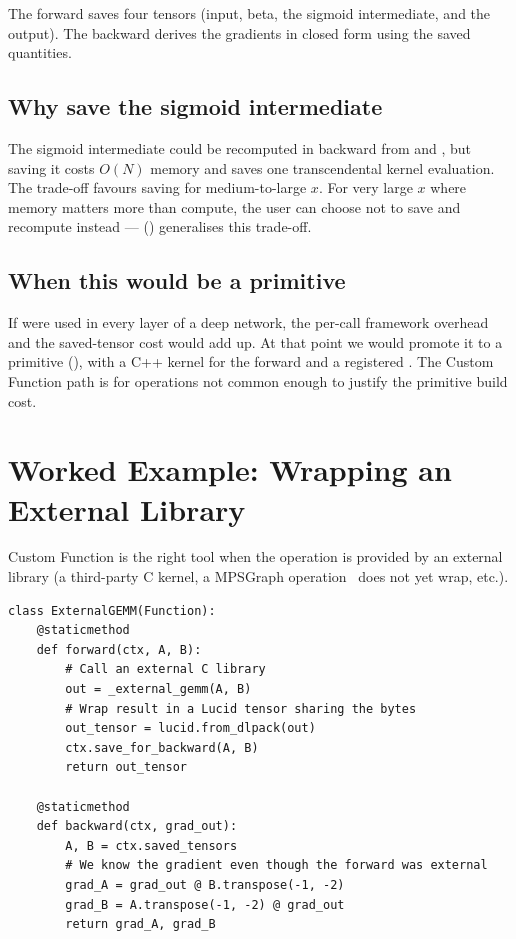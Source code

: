The forward saves four tensors (input, beta, the sigmoid
intermediate, and the output). The backward derives the
gradients in closed form using the saved quantities.

\subsection{Why save the sigmoid intermediate}
\label{ssec:custom_functions:save_intermediate}

The sigmoid intermediate could be recomputed in backward from
 and , but saving it costs $O(N)$ memory and
saves one transcendental kernel evaluation. The trade-off favours
saving for medium-to-large $x$. For very large $x$ where memory
matters more than compute, the user can choose not to save and
recompute instead --- 
() generalises this trade-off.

\subsection{When this would be a primitive}
\label{ssec:custom_functions:could_be_prim}

If  were used in every layer of a deep network,
the per-call framework overhead and the saved-tensor cost would
add up. At that point we would promote it to a primitive
(), with a C++ kernel for the forward and
a registered . The Custom Function path is for
operations not common enough to justify the primitive build cost.

\section{Worked Example: Wrapping an External Library}
\label{sec:custom_functions:external}

Custom Function is the right tool when the operation is provided
by an external library (a third-party C kernel, a MPSGraph
operation \Lucid\ does not yet wrap, etc.).

\begin{lstlisting}[style=lucid,language=LucidPython]
class ExternalGEMM(Function):
    @staticmethod
    def forward(ctx, A, B):
        # Call an external C library
        out = _external_gemm(A, B)
        # Wrap result in a Lucid tensor sharing the bytes
        out_tensor = lucid.from_dlpack(out)
        ctx.save_for_backward(A, B)
        return out_tensor

    @staticmethod
    def backward(ctx, grad_out):
        A, B = ctx.saved_tensors
        # We know the gradient even though the forward was external
        grad_A = grad_out @ B.transpose(-1, -2)
        grad_B = A.transpose(-1, -2) @ grad_out
        return grad_A, grad_B
\end{lstlisting}

